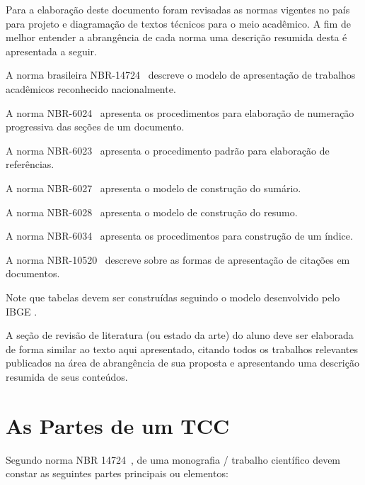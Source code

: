 \documentclass[repeatfields,xlists,xpacks,oneside]{ufrgscca}
\begin{document}
Para a elaboração deste documento foram revisadas as normas vigentes no país
para projeto e diagramação de textos técnicos para o meio acadêmico. A fim
de melhor entender a abrangência de cada norma uma descrição resumida desta
é apresentada a seguir.

A norma brasileira NBR-14724~\cite{ABNT:NBR-14724-2011} descreve o modelo de
apresentação de trabalhos acadêmicos reconhecido nacionalmente.

A norma NBR-6024~\cite{ABNT:NBR-6024-2003}  apresenta os procedimentos para
elaboração de numeração progressiva das seções de um documento.

A norma  NBR-6023~\cite{ABNT:NBR-6023-2002} apresenta o procedimento padrão
para elaboração de referências.

A norma NBR-6027~\cite{ABNT:NBR-6027-2003} apresenta o modelo de construção do sumário.

A norma NBR-6028~\cite{ABNT:NBR-6028-2003} apresenta o modelo de construção do resumo.

A norma NBR-6034~\cite{ABNT:NBR-6034-2004} apresenta os procedimentos para construção de um índice.

A norma NBR-10520~\cite{ABNT:NBR-10520-2002} descreve sobre as
formas de apresentação de citações em documentos.


Note que tabelas devem ser construídas seguindo o modelo desenvolvido pelo IBGE \cite{IBGE:tabular-1993}.


A seção de revisão de literatura (ou estado da arte) do aluno deve ser
elaborada de forma similar ao texto aqui apresentado, citando todos os
trabalhos relevantes publicados na área de abrangência de sua proposta e
apresentando uma descrição resumida de seus conteúdos.

\chapter{As Partes de um TCC}
\label{partes}


Segundo norma NBR 14724~\cite{ABNT:NBR-14724-2011},
de uma monografia / trabalho científico devem constar as seguintes partes principais ou
elementos:
\end{document}
